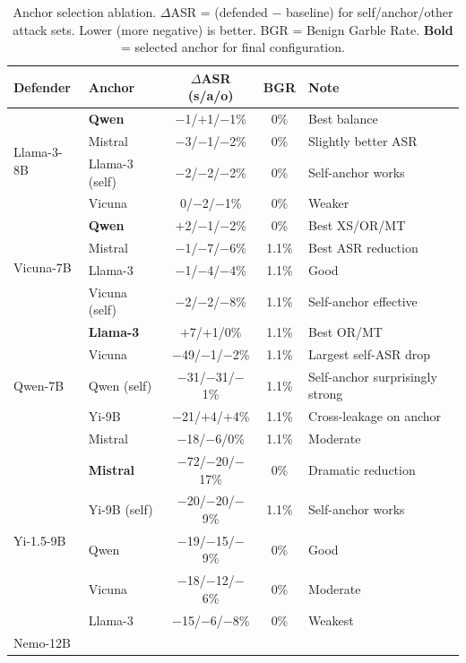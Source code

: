 \begin{table}[h]
\centering
\setlength{\tabcolsep}{4pt}
\renewcommand{\arraystretch}{1.1}
\caption{Anchor selection ablation. $\Delta$ASR = (defended $-$ baseline) for self/anchor/other attack sets. Lower (more negative) is better. BGR = Benign Garble Rate. \textbf{Bold} = selected anchor for final configuration.}
\label{tab:anchor_ablation}
\begin{tabular}{@{}llccl@{}}
\toprule
\textbf{Defender} & \textbf{Anchor} & \textbf{$\Delta$ASR (s/a/o)} & \textbf{BGR} & \textbf{Note} \\
\midrule
\multirow{4}{*}{Llama-3-8B}
  & \textbf{Qwen} & $-$1/$+$1/$-$1\% & 0\% & Best balance \\
  & Mistral & $-$3/$-$1/$-$2\% & 0\% & Slightly better ASR \\
  & Llama-3 (self) & $-$2/$-$2/$-$2\% & 0\% & Self-anchor works \\
  & Vicuna & 0/$-$2/$-$1\% & 0\% & Weaker \\
\midrule
\multirow{4}{*}{Vicuna-7B}
  & \textbf{Qwen} & $+$2/$-$1/$-$2\% & 0\% & Best XS/OR/MT \\
  & Mistral & $-$1/$-$7/$-$6\% & 1.1\% & Best ASR reduction \\
  & Llama-3 & $-$1/$-$4/$-$4\% & 1.1\% & Good \\
  & Vicuna (self) & $-$2/$-$2/$-$8\% & 1.1\% & Self-anchor effective \\
\midrule
\multirow{5}{*}{Qwen-7B}
  & \textbf{Llama-3} & $+$7/$+$1/0\% & 1.1\% & Best OR/MT \\
  & Vicuna & $-$49/$-$1/$-$2\% & 1.1\% & Largest self-ASR drop \\
  & Qwen (self) & $-$31/$-$31/$-$1\% & 1.1\% & Self-anchor surprisingly strong \\
  & Yi-9B & $-$21/$+$4/$+$4\% & 1.1\% & Cross-leakage on anchor \\
  & Mistral & $-$18/$-$6/0\% & 1.1\% & Moderate \\
\midrule
\multirow{5}{*}{Yi-1.5-9B}
  & \textbf{Mistral} & $-$72/$-$20/$-$17\% & 0\% & Dramatic reduction \\
  & Yi-9B (self) & $-$20/$-$20/$-$9\% & 1.1\% & Self-anchor works \\
  & Qwen & $-$19/$-$15/$-$9\% & 0\% & Good \\
  & Vicuna & $-$18/$-$12/$-$6\% & 0\% & Moderate \\
  & Llama-3 & $-$15/$-$6/$-$8\% & 0\% & Weakest \\
\midrule
\multirow{5}{*}{Nemo-12B}

\end{tabular}
\end{table}
